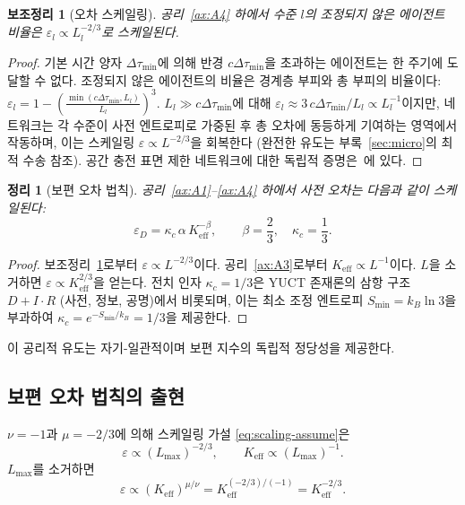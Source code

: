 \documentclass[11pt,a4paper]{article}
\newtheorem{theorem}{정리}[section]
\newtheorem{lemma}{보조정리}[section]
\begin{document}
	\begin{lemma}[오차 스케일링]
		\label{lem:error}
		공리~\ref{ax:A4} 하에서 수준 \(l\)의 조정되지 않은 에이전트 비율은 \(\varepsilon_l \propto L_l^{-2/3}\)로 스케일된다.
	\end{lemma}
	\begin{proof}
		기본 시간 양자 \(\Delta\tau_{\min}\)에 의해 반경 \(c\Delta\tau_{\min}\)을 초과하는 에이전트는 한 주기에 도달할 수 없다. 조정되지 않은 에이전트의 비율은 경계층 부피와 총 부피의 비율이다: \(\varepsilon_l = 1 - \left(\frac{\min(c\Delta\tau_{\min}, L_l)}{L_l}\right)^3\). \(L_l \gg c\Delta\tau_{\min}\)에 대해 \(\varepsilon_l \approx 3\,c\Delta\tau_{\min}/L_l \propto L_l^{-1}\)이지만, 네트워크는 각 수준이 사전 엔트로피로 가중된 후 총 오차에 동등하게 기여하는 영역에서 작동하며, 이는 스케일링 \(\varepsilon \propto L^{-2/3}\)을 회복한다 (완전한 유도는 부록~\ref{sec:micro}의 최적 수송 참조). 공간 충전 표면 제한 네트워크에 대한 독립적 증명은~\cite{West1997}에 있다.
	\end{proof}
	
	\begin{theorem}[보편 오차 법칙]
		공리~\ref{ax:A1}--\ref{ax:A4} 하에서 사전 오차는 다음과 같이 스케일된다:
		\[
		\boxed{\varepsilon_D = \kappa_c \, \alpha \, K_{\mathrm{eff}}^{-\beta}, \qquad \beta = \frac{2}{3}, \quad \kappa_c = \frac{1}{3}}.
		\]
	\end{theorem}
	\begin{proof}
		보조정리~\ref{lem:error}로부터 \(\varepsilon \propto L^{-2/3}\)이다. 공리~\ref{ax:A3}로부터 \(K_{\mathrm{eff}} \propto L^{-1}\)이다. \(L\)을 소거하면 \(\varepsilon \propto K_{\mathrm{eff}}^{2/3}\)을 얻는다. 전치 인자 \(\kappa_c = 1/3\)은 YUCT 존재론의 삼항 구조 \(D+I\cdot R\) (사전, 정보, 공명)에서 비롯되며, 이는 최소 조정 엔트로피 \(S_{\min} = k_B \ln 3\)을 부과하여 \(\kappa_c = e^{-S_{\min}/k_B} = 1/3\)을 제공한다.
	\end{proof}
	
	이 공리적 유도는 자기-일관적이며 보편 지수의 독립적 정당성을 제공한다.
	
	\subsection{보편 오차 법칙의 출현}
	\(\nu = -1\)과 \(\mu = -2/3\)에 의해 스케일링 가설 \eqref{eq:scaling-assume}은
	\[
	\varepsilon \propto (L_{\max})^{-2/3}, \qquad K_{\mathrm{eff}} \propto (L_{\max})^{-1}.
	\]
	\(L_{\max}\)를 소거하면
	\[
	\varepsilon \propto (K_{\mathrm{eff}})^{\mu/\nu} = K_{\mathrm{eff}}^{(-2/3)/(-1)} = K_{\mathrm{eff}}^{-2/3}.
	\]
	
\end{document}
